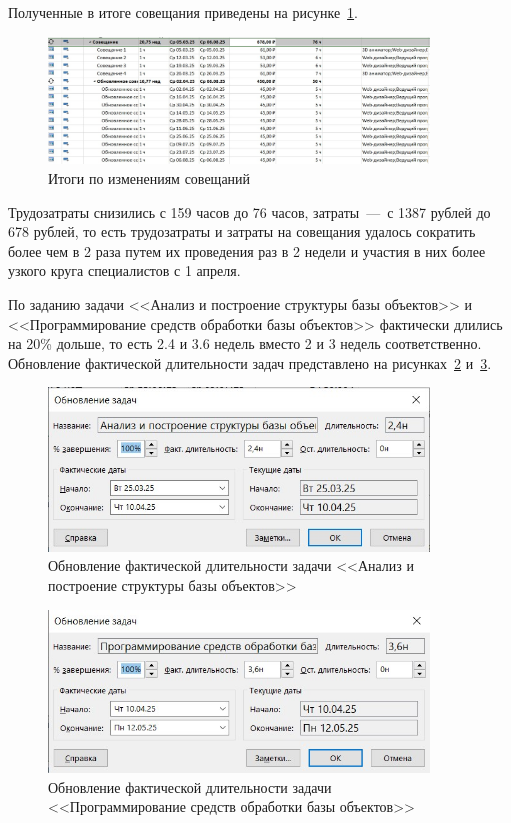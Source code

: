 Полученные в итоге совещания приведены на рисунке~\ref{fig:screen12}.

\begin{figure}[H]
	\centering
	\includegraphics[width=0.9\textwidth]{img/screen12.jpg}
	\caption{Итоги по изменениям совещаний}
	\label{fig:screen12}
\end{figure}

Трудозатраты снизились с 159 часов до 76 часов, затраты~---~с 1387 рублей до 678 рублей, то есть трудозатраты и затраты на совещания удалось сократить более чем в 2 раза путем их проведения раз в 2 недели и участия в них более узкого круга специалистов с 1 апреля.

По заданию задачи <<Анализ и построение структуры базы объектов>> и <<Программирование средств обработки базы объектов>> фактически длились на 20\% дольше, то есть 2.4 и 3.6 недель вместо 2 и 3 недель соответственно.
Обновление фактической длительности задач представлено на рисунках~\ref{fig:screen17} и~\ref{fig:screen18}.

\begin{figure}[H]
	\centering
	\includegraphics[width=0.9\textwidth]{img/screen17.jpg}
	\caption{Обновление фактической длительности задачи <<Анализ и построение структуры базы объектов>>}
	\label{fig:screen17}
\end{figure}

\begin{figure}[H]
	\centering
	\includegraphics[width=0.9\textwidth]{img/screen18.jpg}
	\caption{Обновление фактической длительности задачи <<Программирование средств обработки базы объектов>>}
	\label{fig:screen18}
\end{figure}

